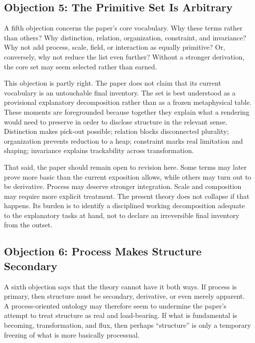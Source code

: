 \documentclass[11pt]{article}
\begin{document}
\subsection{Objection 5: The Primitive Set Is Arbitrary}

A fifth objection concerns the paper's core vocabulary. Why these terms rather than others? Why distinction, relation, organization, constraint, and invariance? Why not add process, scale, field, or interaction as equally primitive? Or, conversely, why not reduce the list even further? Without a stronger derivation, the core set may seem selected rather than earned.

This objection is partly right. The paper does not claim that its current vocabulary is an untouchable final inventory. The set is best understood as a provisional explanatory decomposition rather than as a frozen metaphysical table. These moments are foregrounded because together they explain what a rendering would need to preserve in order to disclose structure in the relevant sense. Distinction makes pick-out possible; relation blocks disconnected plurality; organization prevents reduction to a heap; constraint marks real limitation and shaping; invariance explains trackability across transformation.

That said, the paper should remain open to revision here. Some terms may later prove more basic than the current exposition allows, while others may turn out to be derivative. Process may deserve stronger integration. Scale and composition may require more explicit treatment. The present theory does not collapse if that happens. Its burden is to identify a disciplined working decomposition adequate to the explanatory tasks at hand, not to declare an irreversible final inventory from the outset.

\subsection{Objection 6: Process Makes Structure Secondary}

A sixth objection says that the theory cannot have it both ways. If process is primary, then structure must be secondary, derivative, or even merely apparent. A process-oriented ontology may therefore seem to undermine the paper's attempt to treat structure as real and load-bearing. If what is fundamental is becoming, transformation, and flux, then perhaps ``structure'' is only a temporary freezing of what is more basically processual.
\end{document}
